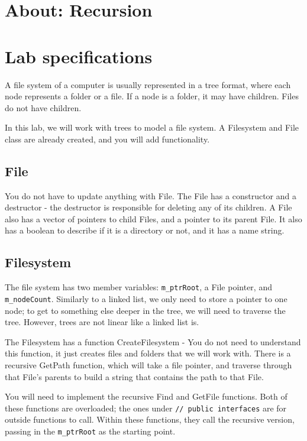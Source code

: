 \documentclass[a4paper,12pt,oneside]{book}
\begin{document}
\section{About: Recursion}


\newpage

\section{Lab specifications}

A file system of a computer is usually represented in a tree format, where each node represents a folder or a file.
If a node is a folder, it may have children. Files do not have children.

In this lab, we will work with trees to model a file system.
A Filesystem and File class are already created, and you will add functionality.

\subsection{File}

You do not have to update anything with File. The File has a constructor
and a destructor - the destructor is responsible for deleting any of its children.
A File also has a vector of pointers to child Files, and a pointer to its
parent File.
It also has a boolean to describe if it is a directory or not, and it has
a name string.

\subsection{Filesystem}

The file system has two member variables: \texttt{m\_ptrRoot}, a File pointer,
and \texttt{m\_nodeCount}. Similarly to a linked list, we only need to store
a pointer to one node; to get to something else deeper in the tree,
we will need to traverse the tree. However, trees are not linear like a linked list is.

The Filesystem has a function CreateFilesystem - You do not need to understand
this function, it just creates files and folders that we will work with.
There is a recursive GetPath function, which will take a file pointer,
and traverse through that File's parents to build a string that contains the path to that File.

You will need to implement the recursive Find and GetFile functions.
Both of these functions are overloaded; the ones under
\texttt{// public interfaces} are for outside functions to call.
Within these functions, they call the recursive version, passing in the
\texttt{m\_ptrRoot} as the starting point.
\end{document}
